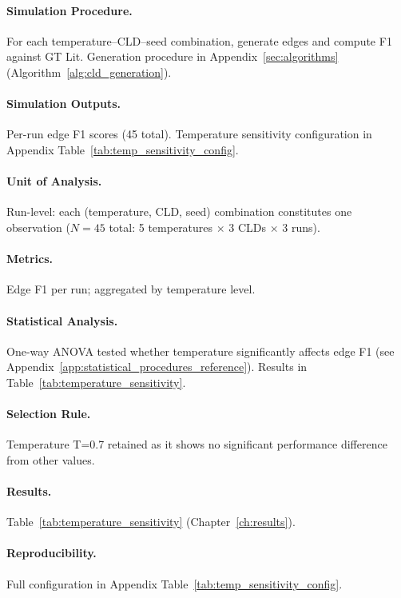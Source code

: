 \paragraph{Simulation Procedure.}
For each temperature--CLD--seed combination, generate edges and compute F1 against GT Lit.
Generation procedure in Appendix~\ref{sec:algorithms} (Algorithm~\ref{alg:cld_generation}).

\paragraph{Simulation Outputs.}
Per-run edge F1 scores (45 total).
Temperature sensitivity configuration in Appendix Table~\ref{tab:temp_sensitivity_config}.

\paragraph{Unit of Analysis.}
Run-level: each (temperature, CLD, seed) combination constitutes one observation ($N=45$ total: 5 temperatures $\times$ 3 CLDs $\times$ 3 runs).

\paragraph{Metrics.}
Edge F1 per run; aggregated by temperature level.

\paragraph{Statistical Analysis.}
One-way ANOVA tested whether temperature significantly affects edge F1 (see Appendix~\ref{app:statistical_procedures_reference}). Results in Table~\ref{tab:temperature_sensitivity}.

\paragraph{Selection Rule.}
Temperature T=0.7 retained as it shows no significant performance difference from other values.

\paragraph{Results.}
Table~\ref{tab:temperature_sensitivity} (Chapter~\ref{ch:results}).

\paragraph{Reproducibility.}
Full configuration in Appendix Table~\ref{tab:temp_sensitivity_config}.

